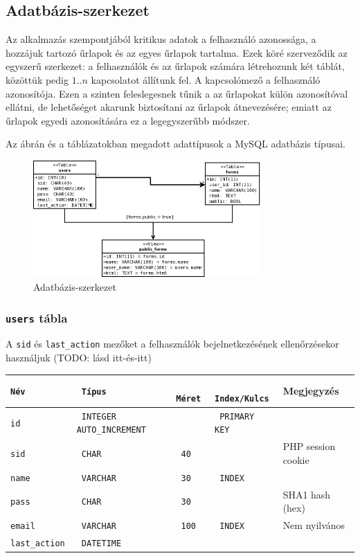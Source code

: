 \documentclass[12pt,a4paper,twoside]{article}
\begin{document}
\subsection{Adatbázis-szerkezet}

Az alkalmazás szempontjából kritikus adatok a felhasználó azonossága, a hozzájuk
tartozó űrlapok és az egyes űrlapok tartalma. Ezek köré szerveződik az egyszerű
szerkezet: a felhasználók és az űrlapok számára létrehozunk két táblát, közöttük
pedig $1..n$ kapcsolatot állítunk fel. A kapcsolómező a felhasználó
azonosítója. Ezen a szinten feleslegesnek tűnik a az űrlapokat külön
azonosítóval ellátni, de lehetőséget akarunk biztosítani az űrlapok
átnevezésére; emiatt az űrlapok egyedi azonosítására ez a legegyszerűbb módszer.

Az ábrán és a táblázatokban megadott adattípusok a MySQL adatbázis típusai.

\begin{figure}[htp]
  \centering
  \includegraphics[width=328px]{db.png}
  \caption{Adatbázis-szerkezet}\label{fig:db}
\end{figure}

\subsubsection{\texttt{users} tábla}
A \texttt{sid} és \texttt{last\_action} mezőket a felhasználók bejelnetkezésének
ellenőrzésekor használjuk (TODO: lásd itt-és-itt)

\small
\vspace{.3cm}
\begin{tabular*}{\textwidth}{>{\tt}l>{\tt}l>{\tt}l>{\tt}l|l}
  \rm Név       &  \rm Típus  &  \rm Méret  & \rm Index/Kulcs & Megjegyzés           \\
  \hline
  id           &   INTEGER AUTO\_INCREMENT && PRIMARY KEY    &                      \\
  sid          &   CHAR      & 40          &                 &  PHP session cookie  \\
  name         &   VARCHAR   & 30          & INDEX           &                      \\
  pass         &   CHAR      & 30          &                 &  SHA1 hash (hex)     \\
  email        &   VARCHAR   & 100         & INDEX           &  Nem nyilvános       \\
  last\_action &   DATETIME  &             &                 &
\end{tabular*}
\normalsize
\end{document}
